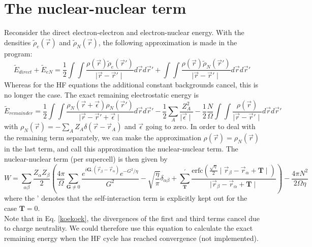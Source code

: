 \documentclass[11pt,a4paper]{article}
\begin{document}
\section{The nuclear-nuclear term}
Reconsider the direct electron-electron and electron-nuclear energy. With the densities $\tilde{\rho}_e(\vec{r})$ and $\tilde{\rho}_N(\vec{r})$, the following approximation is made in the program:
\begin{equation}
\tilde{E}_{direct} + \tilde{E}_{eN} = \frac{1}{2} \int \int \frac{\rho(\vec{r}) \tilde{\rho}_e(\vec{r}')}{\mid \vec{r} - \vec{r}' \mid} d\vec{r} d\vec{r}' + \int \int \frac{\rho(\vec{r}) \tilde{\rho}_N(\vec{r}')}{\mid \vec{r} - \vec{r}' \mid} d\vec{r} d\vec{r}'
\end{equation}
Whereas for the HF equations the additional constant backgrounds cancel, this is no longer the case. The exact remaining electrostatic energy is 
\begin{equation}
\tilde{E}_{remainder} = \frac{1}{2} \int \int \frac{\rho_N(\vec{r} + \vec{\epsilon}) \rho_N(\vec{r}')}{\mid \vec{r} - \vec{r}' + \vec{\epsilon} \mid} d\vec{r} d\vec{r}' - \frac{1}{2} \sum\limits_A \frac{Z_A^2}{\mid \vec{\epsilon} \mid} - \frac{1}{2} \frac{N}{\Omega} \int \int \frac{\rho(\vec{r})}{\mid \vec{r} - \vec{r}' \mid} d\vec{r} d\vec{r}' \label{koekoek}
\end{equation}
with $\rho_N(\vec{r}) = - \sum\limits_A Z_A \delta(\vec{r} - \vec{r}_A)$ and $\vec{\epsilon}$ going to zero. In order to deal with the remaining term separately, we can make the approximation $\rho(\vec{r}) = \rho_N(\vec{r})$ in the last term, and call this approximation the nuclear-nuclear term. The nuclear-nuclear term (per supercell) is then given by
\begin{equation}
W = \sum\limits_{\alpha\beta} \frac{Z_{\alpha}Z_{\beta}}{2} \left( \frac{4\pi}{\Omega} \sum\limits_{\mathbf{G} \neq 0} \frac{e^{i \mathbf{G}.(\vec{r}_{\beta} - \vec{r}_{\alpha})} e^{-G^2/\eta}}{G^2} - \sqrt{\frac{\eta}{\pi}} \delta_{\alpha\beta} + \sum\limits_{\mathbf{T}}^{'} \frac{\text{erfc}\left( \frac{\sqrt{\eta}}{2} \mid \vec{r}_{\beta} - \vec{r}_{\alpha} + \mathbf{T} \mid \right)}{\mid \vec{r}_{\beta} - \vec{r}_{\alpha} + \mathbf{T} \mid}  \right) - \frac{4 \pi N^2}{2 \Omega \eta} \label{gjgj3}
\end{equation}
where the ' denotes that the self-interaction term is explicitly kept out for the case $\mathbf{T} = 0$.\\

Note that in Eq. \eqref{koekoek}, the divergences of the first and third terms cancel due to charge neutrality. We could therefore use this equation to calculate the exact remaining energy when the HF cycle has reached convergence (not implemented).
\end{document}
